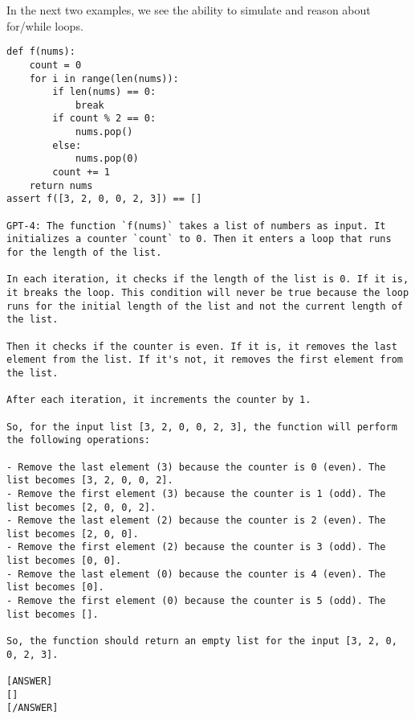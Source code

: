 In the next two examples, we see the ability to simulate and reason about for/while loops.
\begin{lstlisting}
def f(nums):
    count = 0
    for i in range(len(nums)):
        if len(nums) == 0:
            break
        if count % 2 == 0:
            nums.pop()
        else:
            nums.pop(0)
        count += 1
    return nums
assert f([3, 2, 0, 0, 2, 3]) == []

GPT-4: The function `f(nums)` takes a list of numbers as input. It initializes a counter `count` to 0. Then it enters a loop that runs for the length of the list. 

In each iteration, it checks if the length of the list is 0. If it is, it breaks the loop. This condition will never be true because the loop runs for the initial length of the list and not the current length of the list.

Then it checks if the counter is even. If it is, it removes the last element from the list. If it's not, it removes the first element from the list. 

After each iteration, it increments the counter by 1.

So, for the input list [3, 2, 0, 0, 2, 3], the function will perform the following operations:

- Remove the last element (3) because the counter is 0 (even). The list becomes [3, 2, 0, 0, 2].
- Remove the first element (3) because the counter is 1 (odd). The list becomes [2, 0, 0, 2].
- Remove the last element (2) because the counter is 2 (even). The list becomes [2, 0, 0].
- Remove the first element (2) because the counter is 3 (odd). The list becomes [0, 0].
- Remove the last element (0) because the counter is 4 (even). The list becomes [0].
- Remove the first element (0) because the counter is 5 (odd). The list becomes [].

So, the function should return an empty list for the input [3, 2, 0, 0, 2, 3].

[ANSWER]
[]
[/ANSWER]
\end{lstlisting}

